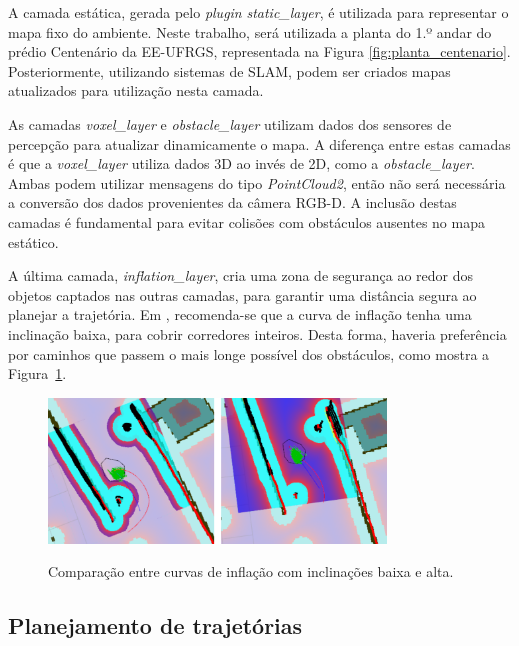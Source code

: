 \documentclass[repeatfields,xlists,xpacks,oneside,yearsonly]{ufrgscca}
\begin{document}
A camada estática, gerada pelo \textit{plugin} \textit{static\_layer},
é utilizada para representar o mapa fixo do ambiente.
Neste trabalho, será utilizada a planta do 1.º andar do prédio Centenário da EE-UFRGS,
representada na Figura \ref{fig:planta_centenario}.
Posteriormente, utilizando sistemas de SLAM, podem ser criados mapas atualizados
para utilização nesta camada.

As camadas \textit{voxel\_layer} e \textit{obstacle\_layer} utilizam dados dos
sensores de percepção para atualizar dinamicamente o mapa.
A diferença entre estas camadas é que a \textit{voxel\_layer} utiliza dados 3D
ao invés de 2D, como a \textit{obstacle\_layer}. Ambas podem utilizar mensagens
do tipo \textit{PointCloud2}, então não será necessária a conversão dos
dados provenientes da câmera RGB-D.
A inclusão destas camadas é fundamental para evitar colisões com obstáculos
ausentes no mapa estático.

A última camada, \textit{inflation\_layer}, cria uma zona de segurança ao redor
dos objetos captados nas outras camadas, para garantir uma distância segura
ao planejar a trajetória.
Em \textcite{ros_tuning_guide}, recomenda-se que a curva de inflação tenha uma
inclinação baixa, para cobrir corredores inteiros.
Desta forma, haveria preferência por caminhos que passem o mais longe possível
dos obstáculos, como mostra a Figura~\ref{fig:inflation_layer}.

\begin{figure}[htbp]
    {
        \centering
        \caption{Comparação entre curvas de inflação com inclinações baixa e alta.}
        \label{fig:inflation_layer}
        \includegraphics[width=0.8\textwidth]{inflation_layer.png}\\
    }
    {}
\end{figure}

\subsection{Planejamento de trajetórias}
\end{document}

